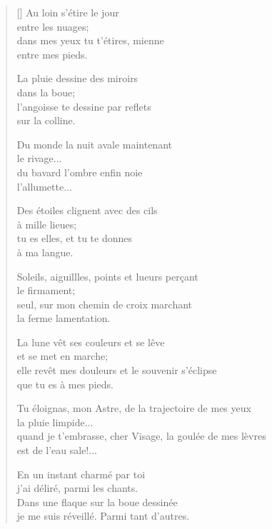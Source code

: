 \documentclass[a4paper,11pt]{article}
\begin{document}
\thispagestyle{empty}


\settowidth{\versewidth}{quand je t'embrasse, cher Visage, la goulée de mes lèvres}

\bigskip

\begin{verse}[\versewidth]
Au loin s'étire le jour \\
\qquad entre les nuages; \\
dans mes yeux tu t'étires, mienne \\
\qquad entre mes pieds.

La pluie dessine des miroirs \\
\qquad dans la boue; \\
l'angoisse te dessine par reflets \\
\qquad sur la colline.

Du monde la nuit avale maintenant \\
\qquad le rivage... \\
du bavard l'ombre enfin noie \\
\qquad l'allumette...

Des étoiles clignent avec des cils \\
\qquad à mille lieues; \\
tu es elles, et tu te donnes \\
\qquad à ma langue.

Soleils, aiguillles, points et lueurs perçant \\
\qquad le firmament; \\
seul, sur mon chemin de croix marchant \\
\qquad la ferme lamentation.

La lune vêt ses couleurs et se lêve \\
\qquad et se met en marche; \\
elle revêt mes douleurs et le souvenir s'éclipse \\
\qquad que tu es à mes pieds.

Tu éloignas, mon Astre, de la trajectoire de mes yeux \\
\qquad la pluie limpide... \\
quand je t'embrasse, cher Visage, la goulée de mes lèvres \\
\qquad est de l'eau sale!...

En un instant charmé par toi \\
\qquad j'ai déliré, parmi les chants. \\
Dans une flaque sur la boue dessinée \\
\qquad je me suis réveillé. Parmi tant d'autres.
\end{verse}
\end{document}
